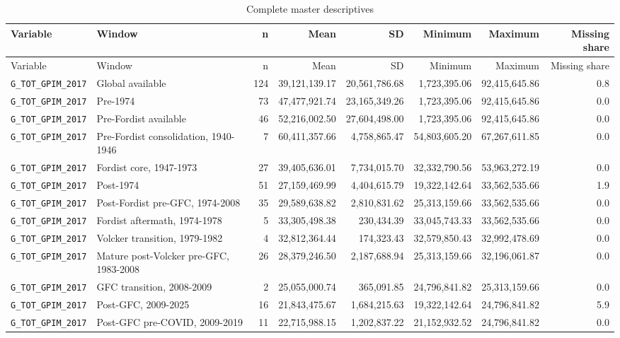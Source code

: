 \begin{landscape}
\begin{longtable}{p{4.4cm}p{3.8cm}rrrrrr}
\caption{Complete master descriptives}\\
\toprule
Variable & Window & n & Mean & SD & Minimum & Maximum & Missing share\\
\midrule
\endfirsthead
\toprule
Variable & Window & n & Mean & SD & Minimum & Maximum & Missing share\\
\midrule
\endhead
\nolinkurl{G_TOT_GPIM_2017} & Global available & 124 & 39,121,139.17 & 20,561,786.68 & 1,723,395.06 & 92,415,645.86 & 0.8
\\
\nolinkurl{G_TOT_GPIM_2017} & Pre-1974 & 73 & 47,477,921.74 & 23,165,349.26 & 1,723,395.06 & 92,415,645.86 & 0.0
\\
\nolinkurl{G_TOT_GPIM_2017} & Pre-Fordist available & 46 & 52,216,002.50 & 27,604,498.00 & 1,723,395.06 & 92,415,645.86 & 0.0
\\
\nolinkurl{G_TOT_GPIM_2017} & Pre-Fordist consolidation, 1940-1946 & 7 & 60,411,357.66 & 4,758,865.47 & 54,803,605.20 & 67,267,611.85 & 0.0
\\
\nolinkurl{G_TOT_GPIM_2017} & Fordist core, 1947-1973 & 27 & 39,405,636.01 & 7,734,015.70 & 32,332,790.56 & 53,963,272.19 & 0.0
\\
\nolinkurl{G_TOT_GPIM_2017} & Post-1974 & 51 & 27,159,469.99 & 4,404,615.79 & 19,322,142.64 & 33,562,535.66 & 1.9
\\
\nolinkurl{G_TOT_GPIM_2017} & Post-Fordist pre-GFC, 1974-2008 & 35 & 29,589,638.82 & 2,810,831.62 & 25,313,159.66 & 33,562,535.66 & 0.0
\\
\nolinkurl{G_TOT_GPIM_2017} & Fordist aftermath, 1974-1978 & 5 & 33,305,498.38 & 230,434.39 & 33,045,743.33 & 33,562,535.66 & 0.0
\\
\nolinkurl{G_TOT_GPIM_2017} & Volcker transition, 1979-1982 & 4 & 32,812,364.44 & 174,323.43 & 32,579,850.43 & 32,992,478.69 & 0.0
\\
\nolinkurl{G_TOT_GPIM_2017} & Mature post-Volcker pre-GFC, 1983-2008 & 26 & 28,379,246.50 & 2,187,688.94 & 25,313,159.66 & 32,196,061.87 & 0.0
\\
\nolinkurl{G_TOT_GPIM_2017} & GFC transition, 2008-2009 & 2 & 25,055,000.74 & 365,091.85 & 24,796,841.82 & 25,313,159.66 & 0.0
\\
\nolinkurl{G_TOT_GPIM_2017} & Post-GFC, 2009-2025 & 16 & 21,843,475.67 & 1,684,215.63 & 19,322,142.64 & 24,796,841.82 & 5.9
\\
\nolinkurl{G_TOT_GPIM_2017} & Post-GFC pre-COVID, 2009-2019 & 11 & 22,715,988.15 & 1,202,837.22 & 21,152,932.52 & 24,796,841.82 & 0.0

\end{longtable}
\end{landscape}
